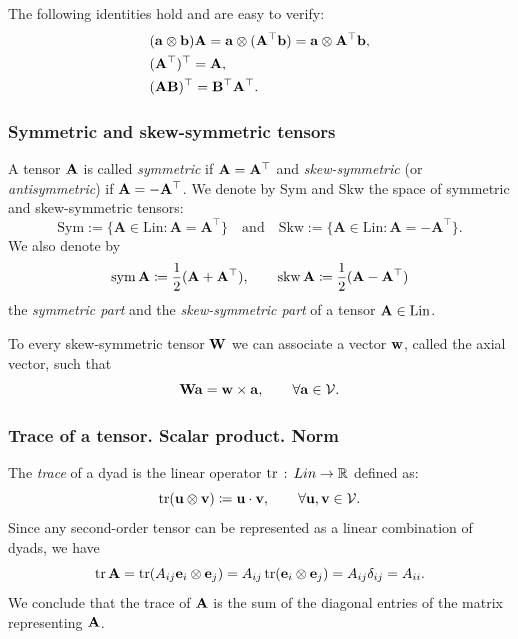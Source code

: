 The following identities hold and are easy to verify:
\begin{equation}
	\begin{aligned}
		& (\mathbf{a} \otimes \mathbf{b})\mathbf{A} =\mathbf{a} \otimes (\mathbf{A} ^\top \mathbf{b})=\mathbf{a} \otimes \mathbf{A} ^\top \mathbf{b},\\
		& (\mathbf{A} ^\top)^\top =\mathbf{A},\\
		& (\mathbf{A} \mathbf{B})^\top= \mathbf{B} ^\top \mathbf{A} ^\top.
	\end{aligned}
\end{equation}

\subsubsection{Symmetric and skew-symmetric tensors}

A tensor $\mathbf{A}$ is called \textit{symmetric} if $\mathbf{A} =\mathbf{A} ^\top$ and \textit{skew-symmetric} (or \textit{antisymmetric}) if  $\mathbf{A} =-\mathbf{A} ^\top$. We denote by Sym and Skw the space of symmetric and skew-symmetric tensors:
\begin{equation}
	\mathrm{Sym}:=\{\mathbf{A}\in\mathrm{Lin}:\mathbf{A}=\mathbf{A}^\top\}\quad\mathrm{and}\quad\mathrm{Skw}:=\{\mathbf{A}\in\mathrm{Lin}:\mathbf{A}=-\mathbf{A}^\top\}.
\end{equation}
We also denote by
\begin{equation}
	\operatorname{sym} \mathbf{A}\coloneqq \frac12 (\mathbf{A}+\mathbf{A}^\top), \qquad  \operatorname{skw} \mathbf{A}\coloneqq \frac12 (\mathbf{A}-\mathbf{A}^\top)
\end{equation}
the \textit{symmetric part} and the \textit{skew-symmetric part} of a tensor $\mathbf{A} \in \operatorname{Lin}$.

To every skew-symmetric tensor $\mathbf{W}$ we can associate a vector $\mathbf{w}$, called the axial vector, such that
\begin{equation}\label{Ww}
	\mathbf{W}\mathbf{a} = \mathbf{w} \times \mathbf{a}, \qquad\forall \mathbf{a} \in \mathcal{V}. 
\end{equation}

\subsubsection{Trace of a tensor. Scalar product. Norm}

The \textit{trace} of a dyad is the linear operator $\operatorname{tr}\,:\, Lin \to \mathbb{R}$ defined as:
\begin{equation}
	\operatorname{tr}(\mathbf{u} \otimes \mathbf{v})\coloneqq \mathbf{u} \cdot \mathbf{v}, \qquad \forall \mathbf{u}, \mathbf{v} \in \mathcal{V}.
\end{equation}
Since any second-order tensor can be represented as a linear combination of dyads, we have
\begin{equation}
	\operatorname{tr}\mathbf{A} =\operatorname{tr}(A_{ij}\mathbf{e}_i\otimes \mathbf{e}_j)=A_{ij}\operatorname{tr}(\mathbf{e}_i\otimes \mathbf{e}_j)=A_{ij}\delta_{ij}=A_{ii}.
\end{equation}
We conclude that the trace of $\mathbf{A}$ is the sum of the diagonal entries of the matrix representing $\mathbf{A}$. 

